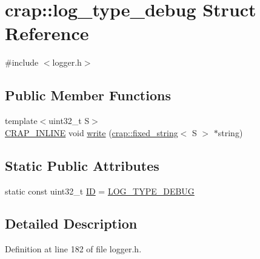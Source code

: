 \hypertarget{structcrap_1_1log__type__debug}{\section{crap\+:\+:log\+\_\+type\+\_\+debug Struct Reference}
\label{structcrap_1_1log__type__debug}
}


{\ttfamily \#include $<$logger.\+h$>$}

\subsection*{Public Member Functions}
\begin{DoxyCompactItemize}
\item 
{\footnotesize template$<$uint32\+\_\+t S$>$ }\\\hyperlink{config__x86_8h_a5a40526b8d842e7ff731509998bb0f1c}{C\+R\+A\+P\+\_\+\+I\+N\+L\+I\+N\+E} void \hyperlink{structcrap_1_1log__type__debug_acf418f0c5aca6d864a913fc5438c88ec}{write} (\hyperlink{classcrap_1_1fixed__string}{crap\+::fixed\+\_\+string}$<$ S $>$ $\ast$string)
\end{DoxyCompactItemize}
\subsection*{Static Public Attributes}
\begin{DoxyCompactItemize}
\item 
static const uint32\+\_\+t \hyperlink{structcrap_1_1log__type__debug_adf6c0dc021a9af949aba94d38fa30f05}{I\+D} = \hyperlink{logger_8h_a542529c1654a19379e8db5625bc7801e}{L\+O\+G\+\_\+\+T\+Y\+P\+E\+\_\+\+D\+E\+B\+U\+G}
\end{DoxyCompactItemize}


\subsection{Detailed Description}


Definition at line 182 of file logger.\+h.



